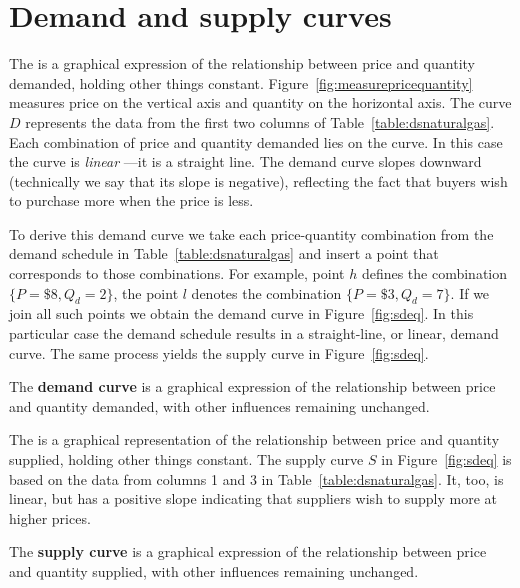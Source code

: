 \section{Demand and supply curves}\label{sec:ch3sec3}

The  is a graphical expression of the relationship
between price and quantity demanded, holding other things constant. Figure~\ref{fig:measurepricequantity}
measures price on the vertical axis and quantity on the
horizontal axis. The curve $D$ represents the data from the first two
columns of Table~\ref{table:dsnaturalgas}. Each combination of price and
quantity demanded lies on the curve. In this case the curve is \textit{linear%
}---it is a straight line. The demand curve slopes downward (technically we
say that its slope is negative), reflecting the fact that buyers wish to
purchase more when the price is less.



\newhtmlpage

To derive this demand curve we take each price-quantity combination from the
demand schedule in Table~\ref{table:dsnaturalgas} and insert a point that corresponds to those
combinations. For example, point $h$ defines the combination $%
\{P=\$8,Q_d=2\}$, the point $l$ denotes the combination $\{P=\$3,Q_d=7\}$.
If we join all such points we obtain the demand curve in Figure~\ref{fig:sdeq}. In
this particular case the demand schedule results in a straight-line, or
linear, demand curve. The same process yields the supply curve in Figure~\ref{fig:sdeq}.

\begin{DefBox}
The \textbf{demand curve} is a graphical expression of the relationship between price and quantity demanded, with other influences remaining unchanged.
\end{DefBox}

The  is a graphical representation of the relationship
between price and quantity supplied, holding other things constant.
The supply curve $S$ in Figure~\ref{fig:sdeq} is based on the data from
columns 1 and 3 in Table~\ref{table:dsnaturalgas}. It, too, is linear, but
has a positive slope indicating that suppliers wish to supply more at higher
prices.

\begin{DefBox}
The \textbf{supply curve} is a graphical expression of the relationship between price and quantity supplied, with other influences remaining unchanged.
\end{DefBox}

